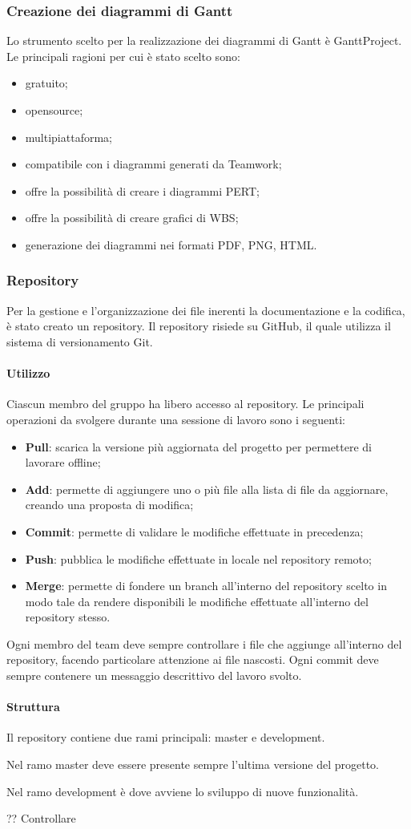 \documentclass[../NormeProgetto.tex]{subfiles}
\begin{document}
		\subsubsection{Creazione dei diagrammi di Gantt}
		Lo strumento scelto per la realizzazione dei diagrammi di Gantt è GanttProject. Le principali ragioni per cui è stato scelto sono:
		\begin{itemize}
			\item gratuito;
			\item opensource;
			\item multipiattaforma;
			\item compatibile con i diagrammi generati da Teamwork;
			\item offre la possibilità di creare i diagrammi PERT;
			\item offre la possibilità di creare grafici di WBS;
			\item generazione dei diagrammi nei formati PDF, PNG, HTML.
		\end{itemize}
		
		\subsubsection{Repository}
		Per la gestione e l'organizzazione dei file inerenti la documentazione e la codifica, è stato creato un repository. Il repository risiede su GitHub, il quale utilizza il sistema di versionamento Git.
		\paragraph{Utilizzo}
		Ciascun membro del gruppo ha libero accesso al repository. Le principali operazioni da svolgere durante una sessione di lavoro sono i seguenti:
		\begin{itemize}
		\item \textbf{Pull}: scarica la versione più aggiornata del progetto per permettere di lavorare offline;
		\item \textbf{Add}: permette di aggiungere uno o più file alla lista di file da aggiornare, creando una proposta di modifica;
		\item \textbf{Commit}: permette di validare le modifiche effettuate in precedenza;
		\item \textbf{Push}: pubblica le modifiche effettuate in locale nel repository remoto;
		\item \textbf{Merge}: permette di fondere un branch all'interno del repository scelto in modo tale da rendere disponibili le modifiche effettuate all'interno del repository stesso.
		\end{itemize}
		Ogni membro del team deve sempre controllare i file che aggiunge all'interno del repository, facendo particolare attenzione ai file nascosti. Ogni commit deve sempre contenere un messaggio descrittivo del lavoro svolto.
		\paragraph{Struttura}
		Il repository contiene due rami principali: master e development.
		
		Nel ramo master deve essere presente sempre l'ultima versione del progetto.
		
		Nel ramo development è dove avviene lo sviluppo di nuove funzionalità.
		
		?? Controllare
\end{document}
